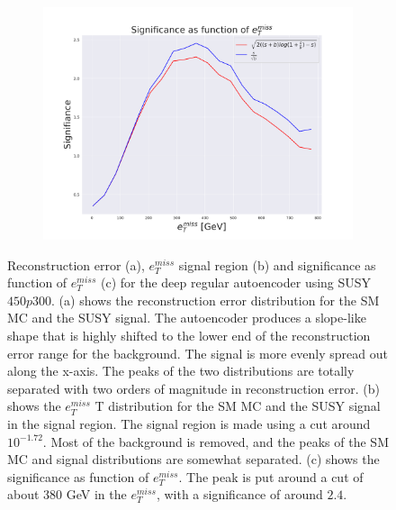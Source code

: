 \begin{figure}[h!]
    \hfill  
    \begin{subfigure}{.49\textwidth}
        \includegraphics[width=\textwidth]{Figures/AE_testing/small/2lep/significance_etmiss_450p0p0300_-1.7167506533614734.pdf}
        \caption{}
        \label{fig:AE_2lep_small_signi_450}
    \end{subfigure}
    \hfill      
    \caption[2lep shallow network | $450p300$ | AE]{Reconstruction error (a), $e_T^{miss}$ signal region (b) and significance as function of 
    $e_T^{miss}$ (c) for the deep regular autoencoder using SUSY $450p300$. 
    (a) shows the reconstruction error distribution for the SM MC and the SUSY signal. 
    The autoencoder produces a slope-like shape that is highly shifted to the lower end of the reconstruction error range
for the background. The signal is more evenly spread out along the x-axis. The peaks of the two distributions are totally separated
with two orders of magnitude in reconstruction error. (b) shows the $e_T^{miss}$
T distribution for the SM MC and the SUSY signal in the signal region. The signal region is made using a cut around
$10^{-1.72}$. Most of the background is removed, and the peaks of the SM MC and signal distributions are
somewhat separated. (c) shows the significance as function of $e_T^{miss}$. The peak is put 
around a cut of about 380 GeV in the $e_T^{miss}$, with a significance of around $2.4$.}
    \label{fig:AE_2lep_small_rec_sig_signi_450}
\end{figure}


